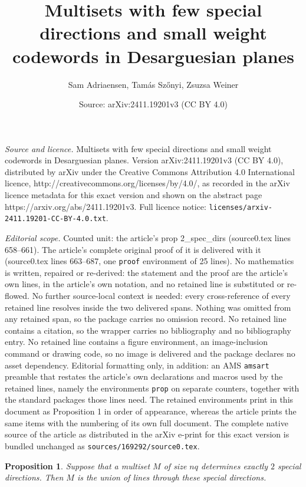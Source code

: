\documentclass[10pt,a4paper]{amsart}
\title{Multisets with few special directions and small weight codewords in Desarguesian planes}
\author{Sam Adriaensen, Tam\'as Sz\H{o}nyi, Zsuzsa Weiner}
\date{Source: arXiv:2411.19201v3 (CC BY 4.0)}
\newtheorem{prop}{Proposition}
\begin{document}
\maketitle

\noindent\emph{Source and licence.} Multisets with few special directions and small weight codewords in Desarguesian planes. Version arXiv:2411.19201v3 (CC BY 4.0), distributed by arXiv under the Creative Commons Attribution 4.0 International licence, http://creativecommons.org/licenses/by/4.0/, as recorded in the arXiv licence metadata for this exact version and shown on the abstract page https://arxiv.org/abs/2411.19201v3. Full licence notice: \texttt{licenses/arxiv-2411.19201-CC-BY-4.0.txt}.\par\smallskip

\noindent\textit{Editorial scope.} Counted unit: the article's prop 2\_spec\_dirs (source0.tex lines 658--661). The article's complete original proof of it is delivered with it (source0.tex lines 663--687, one \texttt{proof} environment of 25 lines). No mathematics is written, repaired or re-derived: the statement and the proof are the article's own lines, in the article's own notation, and no retained line is substituted or re-flowed.  No further source-local context is needed: every cross-reference of every retained line resolves inside the two delivered spans.  Nothing was omitted from any retained span, so the package carries no omission record.  No retained line contains a citation, so the wrapper carries no bibliography and no bibliography entry.  No retained line contains a figure environment, an image-inclusion command or drawing code, so no image is delivered and the package declares no asset dependency.  Editorial formatting only, in addition: an AMS \texttt{amsart} preamble that restates the article's own declarations and macros used by the retained lines, namely the environments \texttt{prop} on separate counters, together with the standard packages those lines need.  The retained environments print in this document as Proposition 1 in order of appearance, whereas the article prints the same items with the numbering of its own full document.  The complete native source of the article as distributed in the arXiv e-print for this exact version is bundled unchanged as \texttt{sources/169292/source0.tex}.
\begin{prop}
\label{2_spec_dirs}
 Suppose that a multiset $M$ of size $nq$ determines exactly $2$ special directions. Then $M$ is the union of lines through these special directions.
\end{prop}
\end{document}
